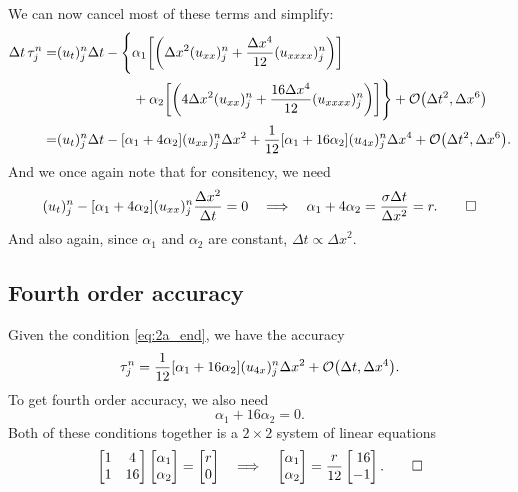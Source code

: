 \documentclass[11pt,letter, swedish, english
]{article}
\newcommand{\Dx}{\ensuremath{\Delta{x}}}
\newcommand{\Dt}{\ensuremath{\Delta{t}}}
\begin{document}
We can now cancel most of these terms and simplify:
\begin{equation}
\begin{aligned}
\Dt\,\tau_j^n=& (u_t)_j^n\Dt
-\Bigg\{\alpha_1\qty[
\qty(\Dx^2(u_{xx})_j^n+\frac{\Dx^4}{12}(u_{xxxx})_j^n)]
\\ &\hspace{55pt}
+\alpha_2\qty[
\qty(4\Dx^2(u_{xx})_j^n+\frac{16\Dx^4}{12}(u_{xxxx})_j^n)]
\Bigg\} +\order{\Dt^2, \Dx^6}\\
=& (u_t)_j^n\Dt-[\alpha_1+4\alpha_2](u_{xx})_j^n\Dx^2
+\frac{1}{12}[\alpha_1+16\alpha_2](u_{4x})_j^n\Dx^4
+\order{\Dt^2, \Dx^6}.
\end{aligned}
\end{equation}
And we once again note that for consitency, we need 
\begin{equation}\label{eq:2a_end}
(u_t)_j^n-[\alpha_1+4\alpha_2](u_{xx})_j^n\frac{\Dx^2}{\Dt}=0
\quad\Longrightarrow\quad
\alpha_1+4\alpha_2=\frac{\sigma\Dt}{\Dx^2}=r.
\qed
\end{equation}
And also again, since $\alpha_1$ and $\alpha_2$ are constant,
$\Dt\propto\Dx^2$. 

\subsection{Fourth order accuracy}
Given the condition \eqref{eq:2a_end}, we have the accuracy
\begin{equation}
\tau_j^n=\frac{1}{12}[\alpha_1+16\alpha_2](u_{4x})_j^n\Dx^2
+\order{\Dt, \Dx^4}.
\end{equation}
To get fourth order accuracy, we also need
\begin{equation}
\alpha_1+16\alpha_2=0.
\end{equation}
Both of these conditions together is a $2\times2$ system of linear
equations 
\begin{equation}
\begin{bmatrix}1&4\\1&16\end{bmatrix}
\begin{bmatrix}\alpha_1\\\alpha_2\end{bmatrix}
=\begin{bmatrix}r\\0\end{bmatrix}
\quad\Longrightarrow\quad
\begin{bmatrix}\alpha_1\\\alpha_2\end{bmatrix}
=\frac{r}{12}\begin{bmatrix*}[r]
16\\-1
\end{bmatrix*}.
\qed
\end{equation}
\end{document}
